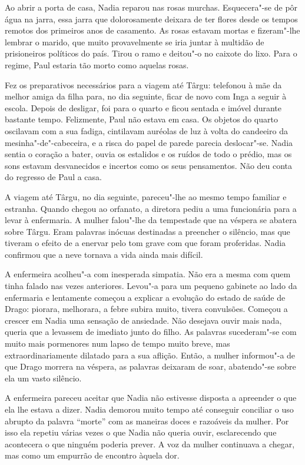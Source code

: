 \bigskip

Ao abrir a porta de casa, Nadia reparou nas rosas murchas.
Esquecera"-se de pôr água na jarra, essa jarra que dolorosamente deixara
de ter flores desde os tempos remotos dos primeiros anos de casamento.
As rosas estavam mortas e fizeram"-lhe lembrar o marido, que muito provavelmente se iria juntar à multidão de prisioneiros políticos
do país. Tirou o ramo e deitou"-o no caixote do lixo. Para o regime, Paul
estaria tão morto como aquelas rosas.

Fez os preparativos necessários para a viagem até Târgu: telefonou à mãe
da melhor amiga da filha para, no dia seguinte, ficar de novo com Inga a
seguir à escola. Depois de desligar, foi para o quarto e ficou sentada e
imóvel durante bastante tempo. Felizmente, Paul não estava em casa. Os
objetos do quarto oscilavam com a sua fadiga, cintilavam auréolas de
luz à volta do candeeiro da mesinha"-de"-cabeceira, e a risca do papel de
parede parecia deslocar"-se. Nadia sentia o coração a bater, ouvia os
estalidos e os ruídos de todo o prédio, mas os sons estavam desvanecidos
e incertos como os seus pensamentos. Não deu conta do regresso de Paul
a casa.

A viagem até Târgu, no dia seguinte, pareceu"-lhe ao mesmo tempo familiar
e estranha. Quando chegou ao orfanato, a diretora pediu a uma
funcionária para a levar à enfermaria. A mulher falou"-lhe da tempestade
que na véspera se abatera sobre Târgu. Eram palavras inócuas destinadas
a preencher o silêncio, mas que tiveram o efeito de a enervar pelo tom
grave com que foram proferidas. Nadia confirmou que a neve tornava a
vida ainda mais difícil.

A enfermeira acolheu"-a com inesperada simpatia. Não era a mesma com quem
tinha falado nas vezes anteriores. Levou"-a para um pequeno gabinete ao
lado da enfermaria e lentamente começou a explicar a evolução do estado
de saúde de Drago: piorara, melhorara, a febre subira muito, tivera
convulsões. Começou a crescer em Nadia uma sensação de ansiedade. Não
desejava ouvir mais nada, queria
que a levassem de imediato junto do filho. As palavras sucederam"-se com
muito mais pormenores num lapso de tempo muito breve, mas
extraordinariamente dilatado para a sua aflição. Então, a mulher
informou"-a de que Drago morrera na véspera, as palavras deixaram de
soar, abatendo"-se sobre ela um vasto silêncio.

A enfermeira pareceu aceitar que Nadia não estivesse disposta a
apreender o que ela lhe estava a dizer. Nadia demorou muito tempo até
conseguir conciliar o uso abrupto da palavra ``morte'' com as maneiras
doces e razoáveis da mulher. Por isso ela repetiu várias vezes o que
Nadia não queria ouvir, esclarecendo que acontecera o que ninguém
poderia prever. A voz da mulher continuava a chegar, mas como um
empurrão de encontro àquela dor.

